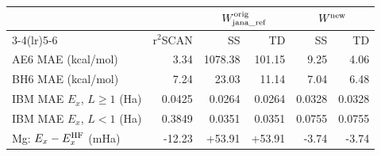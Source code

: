\begin{tabular}{@{}l rrrrr@{}}
\toprule
 & & \multicolumn{2}{c}{$W^{\rm orig}_{\rm jana\_ref}$} & \multicolumn{2}{c}{$W^{\rm new}$} \\
\cmidrule(lr){3-4}\cmidrule(lr){5-6}
 & r$^2$SCAN & SS & TD & SS & TD \\
\midrule
AE6 MAE (kcal/mol) & \textcolor{pyscfred}{3.34} & \textcolor{pyscfred}{1078.38} & \textcolor{pyscfred}{101.15} & \textcolor{pyscfred}{9.25} & \textcolor{pyscfred}{4.06} \\
BH6 MAE (kcal/mol) & \textcolor{pyscfred}{7.24} & \textcolor{pyscfred}{23.03} & \textcolor{pyscfred}{11.14} & \textcolor{pyscfred}{7.04} & \textcolor{pyscfred}{6.48} \\
IBM MAE $E_x$, $L\geq1$ (Ha) & \textcolor{pyscfred}{0.0425} & \textcolor{pyscfred}{0.0264} & \textcolor{pyscfred}{0.0264} & \textcolor{pyscfred}{0.0328} & \textcolor{pyscfred}{0.0328} \\
IBM MAE $E_x$, $L<1$ (Ha) & \textcolor{pyscfred}{0.3849} & \textcolor{pyscfred}{0.0351} & \textcolor{pyscfred}{0.0351} & \textcolor{pyscfred}{0.0755} & \textcolor{pyscfred}{0.0755} \\
Mg: $E_x-E_x^{\rm HF}$ (mHa) & \textcolor{pyscfred}{-12.23} & \textcolor{pyscfred}{+53.91} & \textcolor{pyscfred}{+53.91} & \textcolor{pyscfred}{-3.74} & \textcolor{pyscfred}{-3.74} \\
\bottomrule
\end{tabular}
